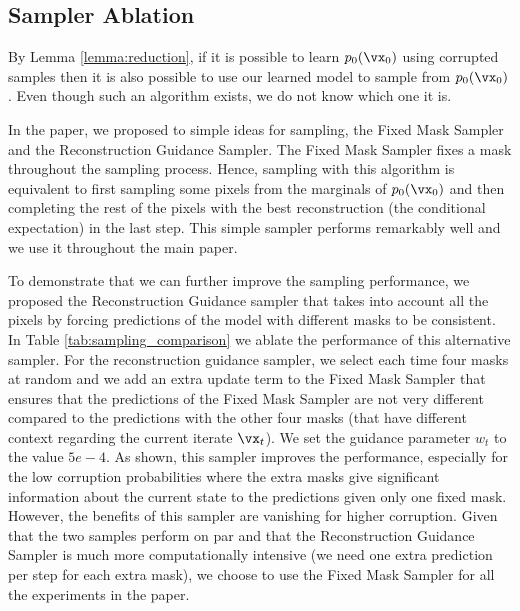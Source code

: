 \documentclass{article}
\begin{document}
\subsection{Sampler Ablation}
\label{sec:sampling_ablation}
By Lemma \ref{lemma:reduction}, if it is possible to learn $p_0(\vx_0)$ using corrupted samples then it is also possible
to use our learned model to sample from $p_0(\vx_0)$. Even though such an algorithm exists, we do not know which one it is. 

In the paper, we proposed to simple ideas for sampling, the Fixed Mask Sampler and the Reconstruction Guidance Sampler. The Fixed Mask Sampler fixes a mask throughout the sampling process. Hence, sampling with this algorithm is equivalent to first sampling some pixels from the marginals of $p_0(\vx_0)$ and then completing the rest of the pixels with the best reconstruction (the conditional expectation) in the last step. This simple sampler performs remarkably well and we use it throughout the main paper.


To demonstrate that we can further improve the sampling performance, we proposed the Reconstruction Guidance sampler that takes into account all the pixels by forcing predictions of the model with different masks to be consistent. In Table \ref{tab:sampling_comparison} we ablate the performance of this alternative sampler. For the reconstruction guidance sampler, we select each time four masks at random and we add an extra update term to the Fixed Mask Sampler that ensures that the predictions of the Fixed Mask Sampler are not very different compared to the predictions with the other four masks (that have different context regarding the current iterate $\vx_t$). We set the guidance parameter $w_t$ to the value $5e-4$. As shown, this sampler improves the performance, especially for the low corruption probabilities where the extra masks give significant information about the current state to the predictions given only one fixed mask. However, the benefits of this sampler are vanishing for higher corruption. Given that the two samples perform on par and that the Reconstruction Guidance Sampler is much more computationally intensive (we need one extra prediction per step for each extra mask), we choose to use the Fixed Mask Sampler for all the experiments in the paper.
\end{document}
